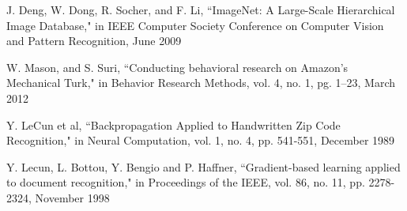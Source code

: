 \begin{thebibliography}{1}
J. Deng, W. Dong, R. Socher, and F. Li, ``ImageNet: A Large-Scale Hierarchical Image Database," in IEEE Computer Society Conference on Computer Vision and Pattern Recognition, June 2009

W. Mason, and S. Suri, ``Conducting behavioral research on Amazon’s Mechanical Turk," in Behavior Research Methods, vol. 4, no. 1, pg. 1--23, March 2012

Y. LeCun et al, ``Backpropagation Applied to Handwritten Zip Code Recognition," in Neural Computation, vol. 1, no. 4, pp. 541-551, December 1989

Y. Lecun, L. Bottou, Y. Bengio and P. Haffner, ``Gradient-based learning applied to document recognition," in Proceedings of the IEEE, vol. 86, no. 11, pp. 2278-2324, November 1998

\end{thebibliography}
